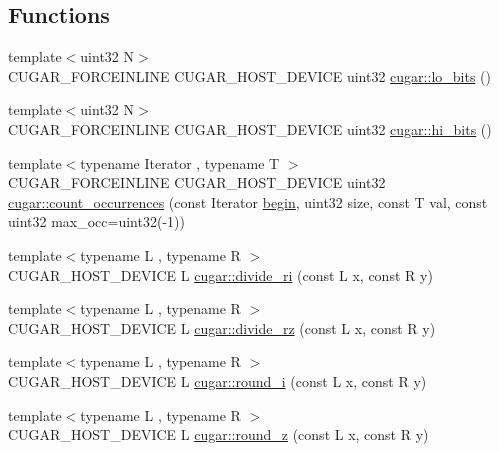 \subsection*{Functions}
\begin{DoxyCompactItemize}
\item 
{\footnotesize template$<$uint32 N$>$ }\\C\+U\+G\+A\+R\+\_\+\+F\+O\+R\+C\+E\+I\+N\+L\+I\+NE C\+U\+G\+A\+R\+\_\+\+H\+O\+S\+T\+\_\+\+D\+E\+V\+I\+CE uint32 \hyperlink{group___basic_utils_gaf1c33dd2c16b4650bae4a033c14f39a5}{cugar\+::lo\+\_\+bits} ()
\item 
{\footnotesize template$<$uint32 N$>$ }\\C\+U\+G\+A\+R\+\_\+\+F\+O\+R\+C\+E\+I\+N\+L\+I\+NE C\+U\+G\+A\+R\+\_\+\+H\+O\+S\+T\+\_\+\+D\+E\+V\+I\+CE uint32 \hyperlink{group___basic_utils_ga47492a6dcbe7be467ffda1dd9ad48fb8}{cugar\+::hi\+\_\+bits} ()
\item 
{\footnotesize template$<$typename Iterator , typename T $>$ }\\C\+U\+G\+A\+R\+\_\+\+F\+O\+R\+C\+E\+I\+N\+L\+I\+NE C\+U\+G\+A\+R\+\_\+\+H\+O\+S\+T\+\_\+\+D\+E\+V\+I\+CE uint32 \hyperlink{group___basic_utils_gae983de927851c298a386b9a35b0e82e4}{cugar\+::count\+\_\+occurrences} (const Iterator \hyperlink{namespacecugar_a2121df08f967e232ea5fe0ee378dee67}{begin}, uint32 size, const T val, const uint32 max\+\_\+occ=uint32(-\/1))
\item 
{\footnotesize template$<$typename L , typename R $>$ }\\C\+U\+G\+A\+R\+\_\+\+H\+O\+S\+T\+\_\+\+D\+E\+V\+I\+CE L \hyperlink{group___basic_utils_gabb6714186dbbd864f0a9298944ba509b}{cugar\+::divide\+\_\+ri} (const L x, const R y)
\item 
{\footnotesize template$<$typename L , typename R $>$ }\\C\+U\+G\+A\+R\+\_\+\+H\+O\+S\+T\+\_\+\+D\+E\+V\+I\+CE L \hyperlink{group___basic_utils_gae5973146d12ab34b3cdf518c2ea0d14b}{cugar\+::divide\+\_\+rz} (const L x, const R y)
\item 
{\footnotesize template$<$typename L , typename R $>$ }\\C\+U\+G\+A\+R\+\_\+\+H\+O\+S\+T\+\_\+\+D\+E\+V\+I\+CE L \hyperlink{group___basic_utils_gab417c685b4c9fc81ccb34e970d4fbc7d}{cugar\+::round\+\_\+i} (const L x, const R y)
\item 
{\footnotesize template$<$typename L , typename R $>$ }\\C\+U\+G\+A\+R\+\_\+\+H\+O\+S\+T\+\_\+\+D\+E\+V\+I\+CE L \hyperlink{group___basic_utils_ga40a1778d81e29db2dd88253a284b0c62}{cugar\+::round\+\_\+z} (const L x, const R y)

\end{DoxyCompactItemize}
